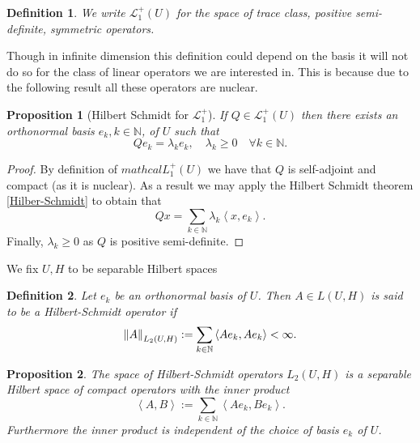 \documentclass[12pt]{article}
\newcommand{\br}[1]{\left\langle#1\right\rangle}
\newcommand{\N}{\mathbb{N}}
\newtheorem{proposition}{Proposition}
\newtheorem{definition}{Definition}
\begin{document}
\begin{definition}
	We write $\mathcal{L}_1^+(U)$ for the space of trace class, positive semi-definite, symmetric operators.
\end{definition}
Though in infinite dimension this definition could depend on the basis it will not do so for the class of linear operators we are interested in. This is because due to the following result all these operators are nuclear.
\begin{proposition}[Hilbert Schmidt for $\mathcal{L}_1^+$]
	If $Q \in \mathcal{L}_1^+(U)$ then there exists an orthonormal basis $e_{k}, k \in \mathbb{N}$, of $U$ such that
	$$
		Q e_{k}=\lambda_{k} e_{k}, \quad \lambda_{k} \geq 0\quad \forall k \in \mathbb{N}.
	$$
\end{proposition}
\begin{proof}
	By definition of $mathcal{L}_1^+(U)$ we have that $Q$ is self-adjoint and compact (as it is nuclear).
	As a result we may apply the Hilbert Schmidt theorem \ref{Hilber-Schmidt} to obtain that
	\begin{equation*}
		Q x=\sum_{k\in\N}\lambda_{k} \br{x,e_{k}}.
	\end{equation*}
	Finally, $\lambda_k\geq 0$ as $Q$ is positive semi-definite.
\end{proof}
We fix $U,H$ to be separable Hilbert spaces
\begin{definition}
	Let $e_k$ be an orthonormal basis of $U$. Then $A\in L(U,H)$ is said to be a \emph{Hilbert-Schmidt} operator if
	\begin{equation*}
		\norm{A}_{L_2(U,H)}:=\sum_{k\in\mathbb{N}}\br{Ae_k,Ae_k}<\infty.
	\end{equation*}
\end{definition}
\begin{proposition}
	The space of Hilbert-Schmidt operators $L_2(U,H)$ is a separable Hilbert space of compact operators with the inner product
	\begin{equation*}
		\br{A,B}:=\sum_{k\in\mathbb{N}}\br{Ae_k,Be_k}.
	\end{equation*}
	Furthermore the inner product is independent of the choice of basis $e_k$ of $U$.
\end{proposition}
\end{document}
